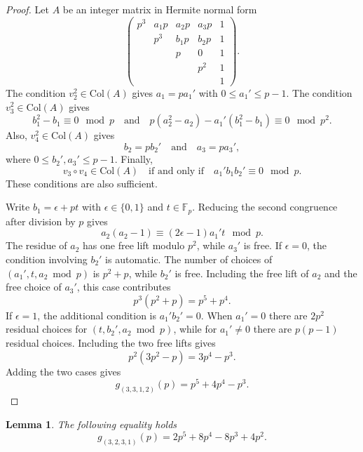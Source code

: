 \documentclass[a4paper]{amsart}
\newtheorem{lemma}[theorem]{Lemma}
\numberwithin{equation}{section}
\theoremstyle{remark}
\newcommand{\F}{\mathbb{F}}
\renewcommand{\Col}{\mathrm{Col}}
\begin{document}
\begin{proof}
Let $A$ be an integer matrix in Hermite normal form
$$
\begin{pmatrix}
p^3&a_1p&a_2p&a_3p&1\\
&p^3&b_1p&b_2p&1\\
&&p&0&1\\
&&&p^2&1\\
&&&&1
\end{pmatrix}.
$$
The condition $v_2^2\in\Col(A)$ gives $a_1=pa_1'$ with $0\leq a_1'\leq p-1$. The condition $v_3^2\in\Col(A)$ gives
\[b_1^2-b_1\equiv0\mod p\quad\text{and}\quad p(a_2^2-a_2)-a_1'(b_1^2-b_1)\equiv0\mod p^2.\]
Also, $v_4^2\in\Col(A)$ gives
\[b_2=pb_2'\quad\text{and}\quad a_3=pa_3',\]
where $0\leq b_2',a_3'\leq p-1$. Finally,
\[v_3\circ v_4\in\Col(A)\quad\text{if and only if}\quad a_1'b_1b_2'\equiv0\mod p.\]
These conditions are also sufficient.

Write $b_1=\epsilon+pt$ with $\epsilon\in\{0,1\}$ and $t\in\F_p$. Reducing the second congruence after division by $p$ gives
\[a_2(a_2-1)\equiv (2\epsilon-1)a_1't\mod p.\]
The residue of $a_2$ has one free lift modulo $p^2$, while $a_3'$ is free. If $\epsilon=0$, the condition involving $b_2'$ is automatic. The number of choices of $(a_1',t,a_2\bmod p)$ is $p^2+p$, while $b_2'$ is free. Including the free lift of $a_2$ and the free choice of $a_3'$, this case contributes
\[p^3(p^2+p)=p^5+p^4.\]
If $\epsilon=1$, the additional condition is $a_1'b_2'=0$. When $a_1'=0$ there are $2p^2$ residual choices for $(t,b_2',a_2\bmod p)$, while for $a_1'\neq0$ there are $p(p-1)$ residual choices. Including the two free lifts gives
\[p^2(3p^2-p)=3p^4-p^3.\]
Adding the two cases gives
\[g_{(3,3,1,2)}(p)=p^5+4p^4-p^3.\]
\end{proof}
\begin{lemma}
    The following equality holds
    \begin{equation}
        g_{(3,2,3,1)}(p)=2p^5+8p^4-8p^3+4p^2.
    \end{equation}
\end{lemma}
\end{document}
